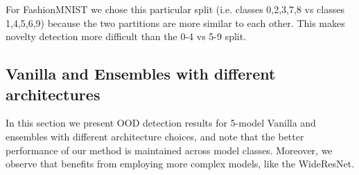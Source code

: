 \vspace{-0.4cm}
For FashionMNIST we chose this particular split (i.e. classes 0,2,3,7,8 vs
classes 1,4,5,6,9) because the two partitions are more similar to each other.
This makes novelty detection more difficult than the 0-4 vs 5-9 split.



\vspace{-0.2cm}
\subsection{Vanilla and  Ensembles with different architectures}
\label{sec:appendix_different_arch}

In this section we present OOD detection results for 5-model Vanilla and
 ensembles with different architecture choices, and note that the
better performance of our method is maintained across model classes. Moreover,
we observe that  benefits from employing more complex models, like the
WideResNet.

